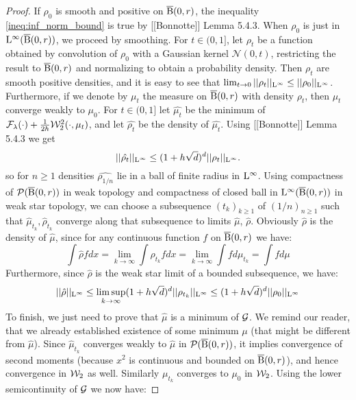 \begin{proof}
If $\rho_0$ is smooth and positive on $\operatorname{\overline{B}}(0,r)$, the inequality \ref{ineq:inf_norm_bound} is true by [[Bonnotte]] Lemma 5.4.3. When $\rho_0$ is just in $\mathrm{L}^{\infty}(\operatorname{\overline{B}}(0,r))$, we proceed by smoothing. 
For $t \in (0,1]$, let $\rho_t$ be a function obtained by convolution of $\rho_0$ with a Gaussian kernel $\mathcal{N}(0, t)$, restricting the result to $\operatorname{\overline{B}}(0,r)$ and normalizing to obtain a probability density. Then $\rho_t$ are smooth positive densities, and it is easy to see that $\lim_{t \rightarrow 0} ||\rho_t||_{\mathrm{L}^{\infty}} \leq ||\rho_0||_{\mathrm{L}^{\infty}}$. Furthermore, if we denote by $\mu_t$ the measure on $\operatorname{\overline{B}}(0,r)$ with density $\rho_t$, then $\mu_t$ converge weakly to $\mu_0$.
For $t \in (0, 1]$ let $\hat{\mu_t}$ be the minimum of $ \mathcal{F}_{\lambda}(\cdot) + \frac{1}{2h} {\cal W}_2^2(\cdot, \mu_t)$, and let $\hat{\rho_t}$ be the density of $\hat{\mu_t}$. Using [[Bonnotte]] Lemma 5.4.3 we get 
\[
||\hat{\rho_t} ||_{\mathrm{L}^{\infty}} \leq (1 + h\sqrt{d})^d ||\rho_t||_{\mathrm{L}^{\infty}}.
\]
so for $n \geq 1$ densities $\hat{\rho_{1/n}}$ lie in a ball of finite radius in $\mathrm{L}^{\infty}$.  Using compactness of $\mathcal{P}(\operatorname{\overline{B}}(0,r))$ in weak topology and compactness of closed ball in $\mathrm{L}^{\infty}(\operatorname{\overline{B}}(0,r))$ in weak star topology, we can choose a subsequence $(t_k)_{k \geq 1}$  of $(1/n)_{n \geq 1}$ such that $\hat{\mu}_{t_k} , \hat{\rho}_{t_k}$ converge along that subsequence to limits $\hat{\mu}$, $\hat{\rho}$. Obviously $\hat{\rho}$ is the density of $\hat{\mu}$, since for any continuous function $f$  on $\operatorname{\overline{B}}(0,r)$ we have:
\[
\int \hat{\rho} f dx = \lim_{k \rightarrow \infty} \int \rho_{t_k} f dx = \lim_{k \rightarrow \infty} \int f d\mu_{t_k} = \int f d\mu
\]
Furthermore, since $\hat{\rho}$ is the weak star limit of a bounded subsequence, we have:
\[
||\hat{\rho} ||_{\mathrm{L}^{\infty}} \leq \limsup_{k \rightarrow \infty}(1 + h\sqrt{d})^d ||\rho_{t_k}||_{\mathrm{L}^{\infty}} \leq (1 + h\sqrt{d})^d ||\rho_0||_{\mathrm{L}^{\infty}}
\]
To finish, we just need to prove that $\hat{\mu}$ is a minimum of $\mathcal{G}$. We remind our reader, that we already established existence of some minimum $\mu$ (that might be different from $\hat{\mu}$). Since $\hat{\mu}_{t_k}$ converges weakly to $\hat{\mu}$ in $\mathcal{P}(\operatorname{\overline{B}}(0,r))$, it implies convergence of second moments (because $x^2$ is continuous and bounded on $\operatorname{\overline{B}}(0,r)$), and hence convergence in ${\cal W}_2$ as well. Similarly $\mu_{t_k}$ converges to $\mu_0$ in ${\cal W}_2$. Using the lower semicontinuity of $\mathcal{G}$ we now have:

\end{proof}
